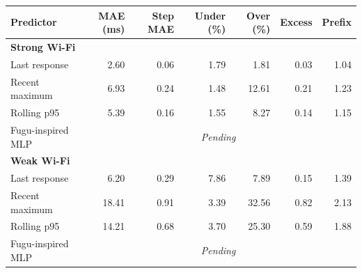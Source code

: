 \begin{tabular}{lrrrrrr}
\toprule
Predictor & MAE (ms) & Step MAE & Under (\%) & Over (\%) & Excess & Prefix \\
\midrule
\multicolumn{7}{l}{\textbf{Strong Wi-Fi}} \\
Last response & 2.60 & 0.06 & 1.79 & 1.81 & 0.03 & 1.04 \\
Recent maximum & 6.93 & 0.24 & 1.48 & 12.61 & 0.21 & 1.23 \\
Rolling p95 & 5.39 & 0.16 & 1.55 & 8.27 & 0.14 & 1.15 \\
Fugu-inspired MLP & \multicolumn{6}{c}{\textit{Pending}} \\
\midrule
\multicolumn{7}{l}{\textbf{Weak Wi-Fi}} \\
Last response & 6.20 & 0.29 & 7.86 & 7.89 & 0.15 & 1.39 \\
Recent maximum & 18.41 & 0.91 & 3.39 & 32.56 & 0.82 & 2.13 \\
Rolling p95 & 14.21 & 0.68 & 3.70 & 25.30 & 0.59 & 1.88 \\
Fugu-inspired MLP & \multicolumn{6}{c}{\textit{Pending}} \\
\bottomrule
\end{tabular}
